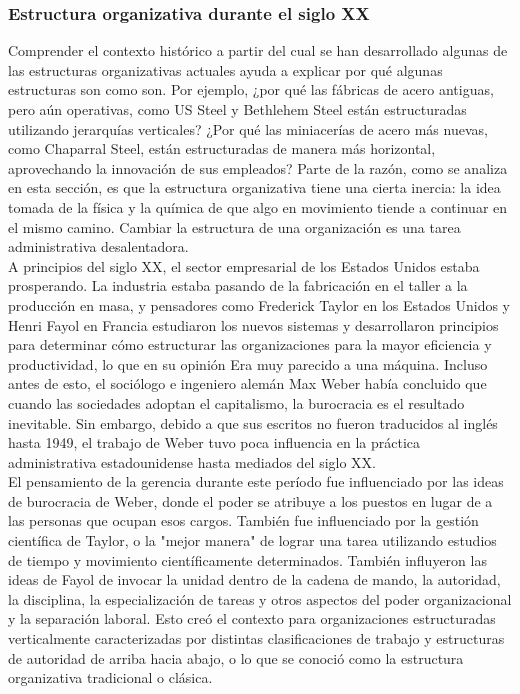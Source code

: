 \documentclass[10pt]{book}
\begin{document}
\subsubsection{Estructura organizativa durante el siglo XX}
Comprender el contexto histórico a partir del cual se han desarrollado algunas de las estructuras organizativas actuales ayuda a explicar por qué algunas estructuras son como son. Por ejemplo, ¿por qué las fábricas de acero antiguas, pero aún operativas, como US Steel y Bethlehem Steel están estructuradas utilizando jerarquías verticales? ¿Por qué las miniacerías de acero más nuevas, como Chaparral Steel, están estructuradas de manera más horizontal, aprovechando la innovación de sus empleados? Parte de la razón, como se analiza en esta sección, es que la estructura organizativa tiene una cierta inercia: la idea tomada de la física y la química de que algo en movimiento tiende a continuar en el mismo camino. Cambiar la estructura de una organización es una tarea administrativa desalentadora.\\
A principios del siglo XX, el sector empresarial de los Estados Unidos estaba prosperando. La industria estaba pasando de la fabricación en el taller a la producción en masa, y pensadores como Frederick Taylor en los Estados Unidos y Henri Fayol en Francia estudiaron los nuevos sistemas y desarrollaron principios para determinar cómo estructurar las organizaciones para la mayor eficiencia y productividad, lo que en su opinión Era muy parecido a una máquina. Incluso antes de esto, el sociólogo e ingeniero alemán Max Weber había concluido que cuando las sociedades adoptan el capitalismo, la burocracia es el resultado inevitable. Sin embargo, debido a que sus escritos no fueron traducidos al inglés hasta 1949, el trabajo de Weber tuvo poca influencia en la práctica administrativa estadounidense hasta mediados del siglo XX.\\
El pensamiento de la gerencia durante este período fue influenciado por las ideas de burocracia de Weber, donde el poder se atribuye a los puestos en lugar de a las personas que ocupan esos cargos. También fue influenciado por la gestión científica de Taylor, o la "mejor manera" de lograr una tarea utilizando estudios de tiempo y movimiento científicamente determinados. También influyeron las ideas de Fayol de invocar la unidad dentro de la cadena de mando, la autoridad, la disciplina, la especialización de tareas y otros aspectos del poder organizacional y la separación laboral. Esto creó el contexto para organizaciones estructuradas verticalmente caracterizadas por distintas clasificaciones de trabajo y estructuras de autoridad de arriba hacia abajo, o lo que se conoció como la estructura organizativa tradicional o clásica.\\
\end{document}
